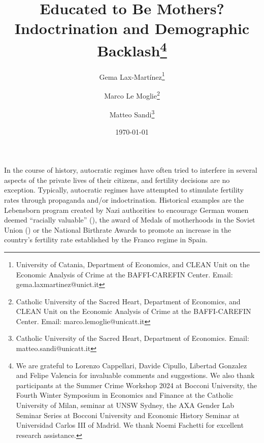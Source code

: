 \documentclass[a4paper,oneside,final,onecolumn,11pt,english]{article}
\begin{document}

\title{ \vspace{-2cm} \huge Educated to Be Mothers? \\ Indoctrination and Demographic Backlash\thanks{\small  We are grateful to Lorenzo Cappellari, Davide Cipullo, Libertad Gonzalez and Felipe Valencia for invaluable comments and suggestions. We also thank participants at the Summer Crime Workshop 2024 at Bocconi University, the Fourth Winter Symposium in Economics and Finance at the Catholic University of Milan, seminar at UNSW Sydney, the AXA Gender Lab Seminar Series at Bocconi University and Economic History Seminar at Universidad Carlos III of Madrid. We thank Noemi Fachetti for excellent research assistance. } \vspace{-0.2cm}}
 
\date{\today }

\author{
Gema Lax-Mart\'{i}nez\thanks{University of Catania, Department of Economics, and CLEAN Unit on the Economic Analysis of Crime at the BAFFI-CAREFIN Center. Email: gema.laxmartinez@unict.it} \\ 
        \and 
        Marco Le Moglie\thanks{Catholic University of the Sacred Heart, Department of Economics, and CLEAN Unit on the Economic Analysis of Crime at the BAFFI-CAREFIN Center. Email: marco.lemoglie@unicatt.it} \\ 
        \and 
        Matteo Sandi\thanks{Catholic University of the Sacred Heart, Department of Economics. Email: matteo.sandi@unicatt.it}\\ 
        }
        
        
\maketitle




\hspace{1cm} In the course of history, autocratic regimes have often tried to interfere in several aspects of the private lives of their citizens, and fertility decisions are no exception. Typically, autocratic regimes have attempted to stimulate fertility rates through propaganda and/or indoctrination. Historical examples are
 the Lebensborn program created by Nazi authorities to %
 encourage German women deemed “racially valuable” (\citeauthor{holocaust}),  the award of Medals of motherhoods in the Soviet Union (\citeauthor{cabinet_oxford}) or the National Birthrate Awards to promote an increase in the country's fertility rate established by the Franco regime in Spain. 
 
\end{document}
